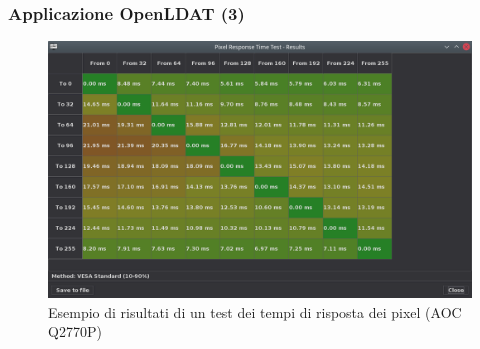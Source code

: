 \documentclass[xcolor={x11names}]{beamer}
\begin{document}
\begin{frame}[shrink=10]
	\frametitle{Applicazione OpenLDAT (3)}
	\begin{figure}
		\includegraphics[width=\textwidth]{Applicazione_files/gui_pixelresponse_results.png}
		\caption*{Esempio di risultati di un test dei tempi di risposta dei pixel (AOC Q2770P)}
	\end{figure}
\end{frame}
\end{document}
